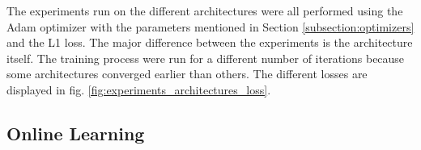The experiments run on the different architectures were all performed using the Adam optimizer with the parameters mentioned in Section \ref{subsection:optimizers} and the L1 loss. The major difference between the experiments is the architecture itself. The training process were run for a different number of iterations because some architectures converged earlier than others. The different losses are displayed in fig. \ref{fig:experiments_architectures_loss}.

\subsection{Online Learning} \label{subsection:experiments_online_learning}



      			
